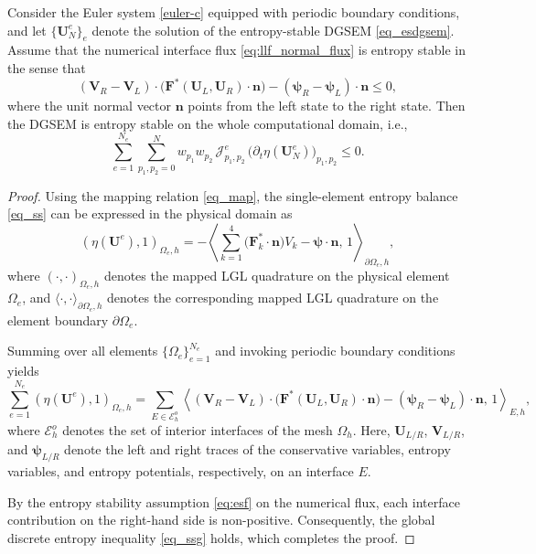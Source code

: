 \documentclass[10pt,a4paper]{amsart}
\begin{document}
\begin{theorem}
Consider the Euler system \eqref{euler-c} equipped with periodic boundary conditions, and let
$\{\bm U_N^e\}_e$ denote the solution of the entropy-stable DGSEM \eqref{eq_esdgsem}.
Assume that the numerical interface flux \eqref{eq:llf_normal_flux} is entropy stable in the sense that
\begin{equation}
\label{eq:esf}    
(\bm V_R - \bm V_L)\cdot\bigl(\boldsymbol F^{*}(\bm U_L, \bm U_R)\cdot\bm n\bigr)
-
(\bm \psi_R - \bm \psi_L)\cdot\bm n \le 0,
\end{equation}
where the unit normal vector $\bm n$ points from the left state to the right state.
Then the DGSEM is entropy stable on the whole computational domain, i.e.,
\begin{equation}
\label{eq_ssg}
\sum_{e=1}^{N_e}\sum_{p_1,p_2=0}^N
w_{p_1} w_{p_2}\,
\mathcal{J}_{p_1,p_2}^e\,
\bigl(\partial_t \eta(\bm U_N^e)\bigr)_{p_1,p_2}
\le 0.
\end{equation}
\end{theorem}

\begin{proof}
Using the mapping relation \eqref{eq_map}, the single-element entropy balance \eqref{eq_ss} can be expressed in the physical domain as
\begin{equation*}
(\eta(\bm U^e), 1)_{\Omega_e,h}
=
-\left\langle
\sum_{k=1}^4 \bigl(\bm F_k^* \cdot \bm n\bigr) V_k
-
\bm \psi \cdot \bm n,
\, 1
\right\rangle_{\partial\Omega_e,h},
\end{equation*}
where $(\cdot,\cdot)_{\Omega_e,h}$ denotes the mapped LGL quadrature on the physical element $\Omega_e$, and
$\langle\cdot,\cdot\rangle_{\partial\Omega_e,h}$ denotes the corresponding mapped LGL quadrature on the element boundary $\partial\Omega_e$.

Summing over all elements $\{\Omega_e\}_{e=1}^{N_e}$ and invoking periodic boundary conditions yields
\begin{equation*}
\sum_{e=1}^{N_e} (\eta(\bm U^e), 1)_{\Omega_e,h}
=
\sum_{E\in\mathcal{E}_h^o}
\left\langle
(\bm V_R - \bm V_L)\cdot\bigl(\boldsymbol F^*(\bm U_L, \bm U_R)\cdot\bm n\bigr)
-
(\bm \psi_R - \bm \psi_L)\cdot\bm n,
\, 1
\right\rangle_{E,h},
\end{equation*}
where $\mathcal{E}_h^o$ denotes the set of interior interfaces of the mesh $\Omega_h$.
Here, $\bm U_{L/R}$, $\bm V_{L/R}$, and $\bm \psi_{L/R}$ denote the left and right traces of the conservative variables, entropy variables, and entropy potentials, respectively, on an interface $E$.

By the entropy stability assumption \eqref{eq:esf} on the numerical flux, each interface contribution on the right-hand side is non-positive. Consequently, the global discrete entropy inequality \eqref{eq_ssg} holds, which completes the proof.
\end{proof}
\end{document}
